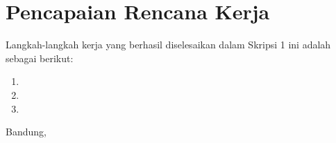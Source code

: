 \documentclass[a4paper,twoside]{article}
\begin{document}
\section{Pencapaian Rencana Kerja}
Langkah-langkah kerja yang berhasil diselesaikan dalam Skripsi 1 ini adalah sebagai berikut:
\begin{enumerate}
\item
\item
\item
\end{enumerate}

 

\vspace{1cm}
\centering Bandung, \tanggal\\
\vspace{2cm} \nama \\ 
\vspace{1cm}
\end{document}

